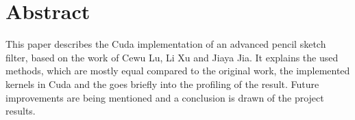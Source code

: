 \section*{Abstract} 
This paper describes the Cuda implementation of an advanced pencil sketch
filter, based on the work of Cewu Lu, Li Xu and Jiaya Jia\cite{mainPaper}.  It
explains the used methods, which are mostly equal compared to the original
work, the implemented kernels in Cuda and the goes briefly into the profiling
of the result.  Future improvements are being mentioned and a conclusion is
drawn of the project results.
